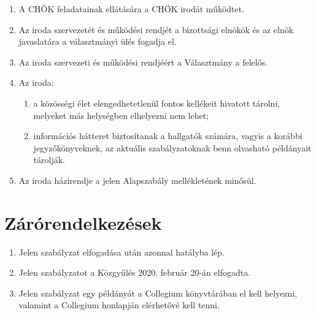 \documentclass{../styles/rulebook}
\begin{document}
\begin{enumerate}
	\item A CHÖK feladatainak ellátására a CHÖK irodát működtet.
	\item Az iroda szervezetét és működési rendjét a bizottsági elnökök és az elnök javaslatára a választmányi ülés fogadja el.
	\item Az iroda szervezeti és működési rendjéért a Választmány a felelős.
	\item Az iroda:
	\begin{enumerate}
		\item a közösségi élet elengedhetetlenül fontos kellékeit hivatott tárolni, melyeket más helységben elhelyezni nem lehet;
		\item információs hátteret biztosítanak a hallgatók számára, vagyis a korábbi jegyzőkönyveknek, az aktuális szabályzatoknak benn olvasható példányait tárolják.
	\end{enumerate}
	\item Az iroda házirendje a jelen Alapszabály mellékletének minősül.
\end{enumerate}


\section{Zárórendelkezések}

\begin{enumerate}
	\item Jelen szabályzat elfogadása után azonnal hatályba lép.
	\item Jelen szabályzatot a Közgyűlés 2020. február 20-án elfogadta.
	\item Jelen szabályzat egy példányát a Collegium könyvtárában el kell helyezni, valamint a Collegium honlapján elérhetővé kell tenni.
\end{enumerate}
\end{document}
